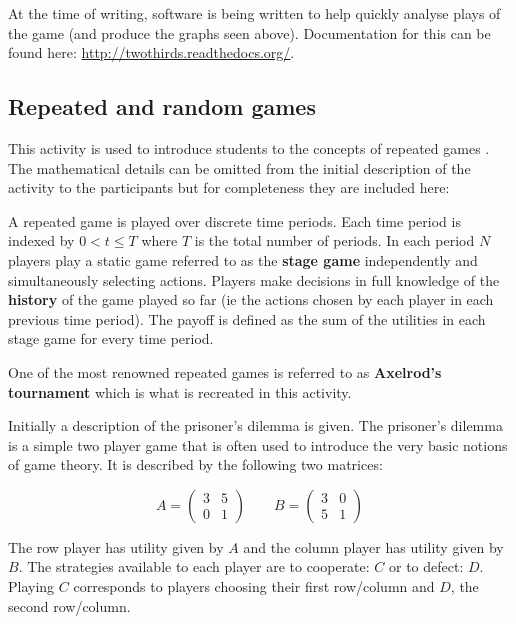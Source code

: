 \documentclass{article}
\begin{document}
At the time of writing, software is being written to help quickly analyse plays of the game (and produce the graphs seen above). Documentation for this can be found here: \url{http://twothirds.readthedocs.org/}.


\subsection{Repeated and random games}\label{sec:repeated_games}

This activity is used to introduce students to the concepts of repeated games
\cite{Maschler2013}. The mathematical details can be omitted from the initial
description of the activity to the participants but for completeness they are
included here:

A repeated game is played over discrete time periods. Each time period is
indexed by \(0<t\leq T\) where \(T\) is the total number of periods.  In each
period \(N\) players play a static game referred to as the \textbf{stage game}
independently and simultaneously selecting actions.  Players make decisions in
full knowledge of the \textbf{history} of the game played so far (ie the actions
chosen by each player in each previous time period).  The payoff is defined
as the sum of the utilities in each stage game for every time period.

One of the most renowned repeated games is referred to as \textbf{Axelrod's
tournament} \cite{Axelrod1980a, Axelrod1980b} which is what is recreated in this
activity.

Initially a description of the prisoner's dilemma \cite{Maschler2013} is given.
The prisoner's dilemma is a simple two player game that is often used to
introduce the very basic notions of game theory. It is described by the
following two matrices:

\[
    A =
    \begin{pmatrix}
        3&5\\
        0&1
    \end{pmatrix}
    \qquad
    B =
    \begin{pmatrix}
        3&0\\
        5&1
    \end{pmatrix}
\]

The row player has utility given by \(A\) and the column player has utility
given by \(B\).
The strategies available to each player are to cooperate: \(C\) or to defect:
\(D\). Playing \(C\) corresponds to players choosing their first row/column and
\(D\), the second row/column.
\end{document}
